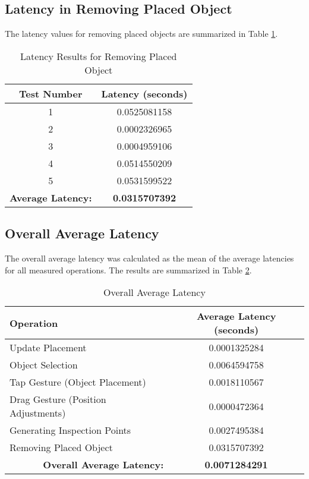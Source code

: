 \subsection{Latency in Removing Placed Object}
The latency values for removing placed objects are summarized in Table \ref{tab:remove_object_latency}.

\begin{table}[h!]
    \centering
    \caption{Latency Results for Removing Placed Object}
    \label{tab:remove_object_latency}
    \begin{tabular}{|c|c|}
        \hline
        \textbf{Test Number} & \textbf{Latency (seconds)} \\
        \hline
        1 & 0.0525081158 \\
        2 & 0.0002326965 \\
        3 & 0.0004959106 \\
        4 & 0.0514550209 \\
        5 & 0.0531599522 \\
        \hline
        \multicolumn{1}{|r|}{\textbf{Average Latency:}} & \textbf{0.0315707392} \\
        \hline
    \end{tabular}
\end{table}

\subsection{Overall Average Latency}
The overall average latency was calculated as the mean of the average latencies for all measured operations. The results are summarized in Table \ref{tab:overall_average_latency}.

\begin{table}[h!]
    \centering
    \caption{Overall Average Latency}
    \label{tab:overall_average_latency}
    \begin{tabular}{|l|c|}
        \hline
        \textbf{Operation} & \textbf{Average Latency (seconds)} \\
        \hline
        Update Placement & 0.0001325284 \\
        Object Selection & 0.0064594758 \\
        Tap Gesture (Object Placement) & 0.0018110567 \\
        Drag Gesture (Position Adjustments) & 0.0000472364 \\
        Generating Inspection Points & 0.0027495384 \\
        Removing Placed Object & 0.0315707392 \\
        \hline
        \multicolumn{1}{|r|}{\textbf{Overall Average Latency:}} & \textbf{0.0071284291} \\
        \hline
    \end{tabular}
\end{table}


